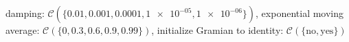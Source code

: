 damping: $\mathcal{C}(\{\num[scientific-notation=true]{0.01},\num[scientific-notation=true]{0.001},\num[scientific-notation=true]{0.0001},\num[scientific-notation=true]{1e-05},\num[scientific-notation=true]{1e-06}\})$, exponential moving average: $\mathcal{C}(\{0,\num[scientific-notation=true]{0.3},\num[scientific-notation=true]{0.6},\num[scientific-notation=true]{0.9},\num[scientific-notation=true]{0.99}\})$, initialize Gramian to identity: $\mathcal{C}(\{\text{no},\text{yes}\})$